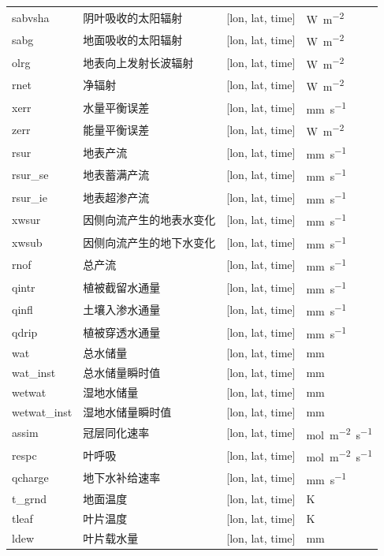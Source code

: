 \documentclass[a4paper,12pt,twoside]{article}
\begin{document}
{\begin{longtable}[htbp]{lp{}p{}l}
sabvsha & 阴叶吸收的太阳辐射 & {[}lon, lat, time{]}  & \unit{W.m^{-2}} \\
sabg & 地面吸收的太阳辐射 & {[}lon, lat, time{]}  & \unit{W.m^{-2}} \\
olrg & 地表向上发射长波辐射 & {[}lon, lat, time{]}  & \unit{W.m^{-2}} \\
rnet & 净辐射 & {[}lon, lat, time{]}  & \unit{W.m^{-2}} \\
xerr & 水量平衡误差 & {[}lon, lat, time{]}  & \unit{mm.s^{-1}} \\
zerr & 能量平衡误差 & {[}lon, lat, time{]}  & \unit{W.m^{-2}} \\
rsur & 地表产流 & {[}lon, lat, time{]}  & \unit{mm.s^{-1}} \\
rsur\_se & 地表蓄满产流 & {[}lon, lat, time{]}  & \unit{mm.s^{-1}} \\
rsur\_ie & 地表超渗产流 & {[}lon, lat, time{]}  & \unit{mm.s^{-1}} \\
xwsur & 因侧向流产生的地表水变化 & {[}lon, lat, time{]}  & \unit{mm.s^{-1}} \\
xwsub & 因侧向流产生的地下水变化 & {[}lon, lat, time{]}  & \unit{mm.s^{-1}} \\
rnof & 总产流 & {[}lon, lat, time{]}  & \unit{mm.s^{-1}} \\
qintr & 植被截留水通量 & {[}lon, lat, time{]}  & \unit{mm.s^{-1}} \\
qinfl & 土壤入渗水通量 & {[}lon, lat, time{]}  & \unit{mm.s^{-1}} \\
qdrip & 植被穿透水通量 & {[}lon, lat, time{]}  & \unit{mm.s^{-1}} \\
wat & 总水储量 & {[}lon, lat, time{]}  & mm \\
wat\_inst & 总水储量瞬时值 & {[}lon, lat, time{]}  & mm \\
wetwat & 湿地水储量 & {[}lon, lat, time{]}  & mm \\
wetwat\_inst & 湿地水储量瞬时值 & {[}lon, lat, time{]}  & mm \\
assim & 冠层同化速率 & {[}lon, lat, time{]}  & \unit{mol.m^{-2}.s^{-1}} \\
respc & 叶呼吸 & {[}lon, lat, time{]}  & \unit{mol.m^{-2}.s^{-1}} \\
qcharge & 地下水补给速率 & {[}lon, lat, time{]}  & \unit{mm.s^{-1}} \\
t\_grnd & 地面温度 & {[}lon, lat, time{]}  & K \\
tleaf & 叶片温度 & {[}lon, lat, time{]}  & K \\
ldew & 叶片载水量 & {[}lon, lat, time{]}  & mm \\

\end{longtable}}
\end{document}
